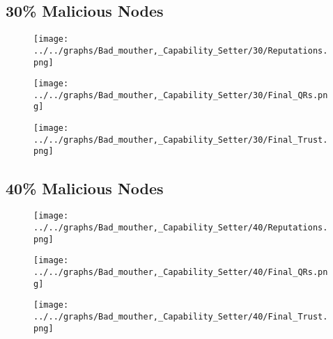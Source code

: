 \begin{minipage}[t]{0.49\columnwidth}
\subsection*{30\% Malicious Nodes}
    \begin{figure}[H]
        \centering
        \texttt{[image: ../../graphs/Bad\_mouther,\_Capability\_Setter/30/Reputations.png]}
    \end{figure}
    \begin{figure}[H]
        \centering
        \texttt{[image: ../../graphs/Bad\_mouther,\_Capability\_Setter/30/Final\_QRs.png]}
    \end{figure}
\end{minipage}
\begin{minipage}[t]{0.49\columnwidth}
    \begin{figure}[H]
        \centering
        \texttt{[image: ../../graphs/Bad\_mouther,\_Capability\_Setter/30/Final\_Trust.png]}
    \end{figure}
\end{minipage}

\begin{minipage}[t]{0.49\columnwidth}
\subsection*{40\% Malicious Nodes}
    \begin{figure}[H]
        \centering
        \texttt{[image: ../../graphs/Bad\_mouther,\_Capability\_Setter/40/Reputations.png]}
    \end{figure}
    \begin{figure}[H]
        \centering
        \texttt{[image: ../../graphs/Bad\_mouther,\_Capability\_Setter/40/Final\_QRs.png]}
    \end{figure}
\end{minipage}
\begin{minipage}[t]{0.49\columnwidth}
    \begin{figure}[H]
        \centering
        \texttt{[image: ../../graphs/Bad\_mouther,\_Capability\_Setter/40/Final\_Trust.png]}
    \end{figure}
\end{minipage}

